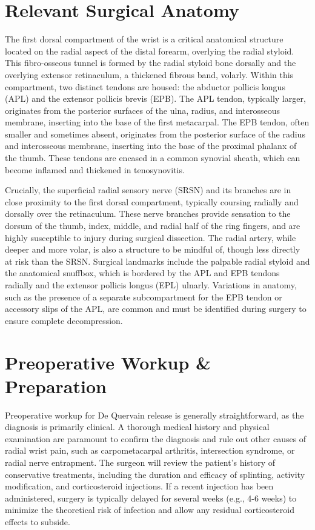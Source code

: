 \section*{Relevant Surgical Anatomy}
The first dorsal compartment of the wrist is a critical anatomical structure located on the radial aspect of the distal forearm, overlying the radial styloid. This fibro-osseous tunnel is formed by the radial styloid bone dorsally and the overlying extensor retinaculum, a thickened fibrous band, volarly. Within this compartment, two distinct tendons are housed: the abductor pollicis longus (APL) and the extensor pollicis brevis (EPB). The APL tendon, typically larger, originates from the posterior surfaces of the ulna, radius, and interosseous membrane, inserting into the base of the first metacarpal. The EPB tendon, often smaller and sometimes absent, originates from the posterior surface of the radius and interosseous membrane, inserting into the base of the proximal phalanx of the thumb. These tendons are encased in a common synovial sheath, which can become inflamed and thickened in tenosynovitis.

Crucially, the superficial radial sensory nerve (SRSN) and its branches are in close proximity to the first dorsal compartment, typically coursing radially and dorsally over the retinaculum. These nerve branches provide sensation to the dorsum of the thumb, index, middle, and radial half of the ring fingers, and are highly susceptible to injury during surgical dissection. The radial artery, while deeper and more volar, is also a structure to be mindful of, though less directly at risk than the SRSN. Surgical landmarks include the palpable radial styloid and the anatomical snuffbox, which is bordered by the APL and EPB tendons radially and the extensor pollicis longus (EPL) ulnarly. Variations in anatomy, such as the presence of a separate subcompartment for the EPB tendon or accessory slips of the APL, are common and must be identified during surgery to ensure complete decompression.

\section*{Preoperative Workup \& Preparation}
Preoperative workup for De Quervain release is generally straightforward, as the diagnosis is primarily clinical. A thorough medical history and physical examination are paramount to confirm the diagnosis and rule out other causes of radial wrist pain, such as carpometacarpal arthritis, intersection syndrome, or radial nerve entrapment. The surgeon will review the patient's history of conservative treatments, including the duration and efficacy of splinting, activity modification, and corticosteroid injections. If a recent injection has been administered, surgery is typically delayed for several weeks (e.g., 4-6 weeks) to minimize the theoretical risk of infection and allow any residual corticosteroid effects to subside.

